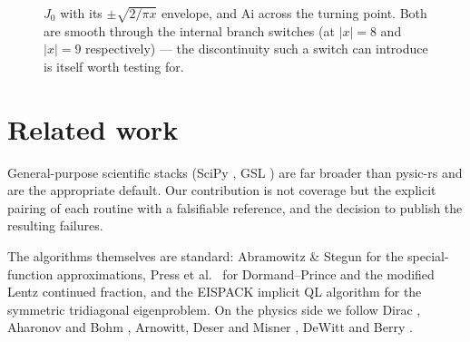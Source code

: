 \documentclass[11pt,a4paper]{article}
\theoremstyle{plain}
\theoremstyle{definition}
\begin{document}
\begin{figure}[h]
\centering
{}
\hfill
{}
\caption{$J_0$ with its $\pm\sqrt{2/\pi x}$ envelope, and $\mathrm{Ai}$ across
the turning point. Both are smooth through the internal branch switches
(at $|x|=8$ and $|x|=9$ respectively) --- the discontinuity such a switch can
introduce is itself worth testing for.}
\end{figure}

\section{Related work}

General-purpose scientific stacks (SciPy \citep{scipy2020}, GSL
\citep{gsl}) are far broader than pysic-rs and are the appropriate default.
Our contribution is not coverage but the explicit pairing of each routine with
a falsifiable reference, and the decision to publish the resulting failures.

The algorithms themselves are standard: Abramowitz \& Stegun
\citep{abramowitz1964} for the special-function approximations, Press et
al.\ \citep{numrecipes} for Dormand--Prince and the modified Lentz continued
fraction, and the EISPACK implicit QL algorithm \citep{eispack} for the
symmetric tridiagonal eigenproblem. On the physics side we follow
Dirac \citep{dirac1928}, Aharonov and Bohm \citep{ab1959}, Arnowitt, Deser and
Misner \citep{adm1959}, DeWitt \citep{dewitt1967} and Berry
\citep{berry1984}.
\end{document}
